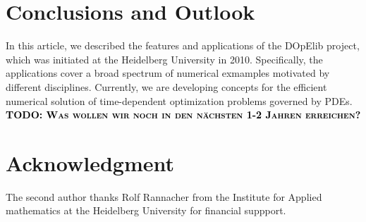 \documentclass[prodmode,acmtoms]{acmsmall}
\numberwithin{equation}{section}
\newcommand{\todo}[1]{\textbf{\textsc{\textcolor{black}{TODO: #1}}}}
\begin{document}
\section{Conclusions and Outlook}
\label{conclusions}
In this article, we described the features 
and applications of the DOpElib project, which 
was initiated at the Heidelberg University in 2010.
Specifically, the applications cover a broad 
spectrum of numerical exmamples motivated 
by different disciplines. 
Currently, we are developing concepts for the efficient 
numerical solution of time-dependent optimization
problems governed by PDEs. 
\todo{Was wollen wir noch in den nächsten 1-2 Jahren erreichen?}



\section*{Acknowledgment}
The second author thanks Rolf Rannacher from
the Institute for Applied mathematics at the 
Heidelberg University for financial suppport. 




%


%
\end{document}
